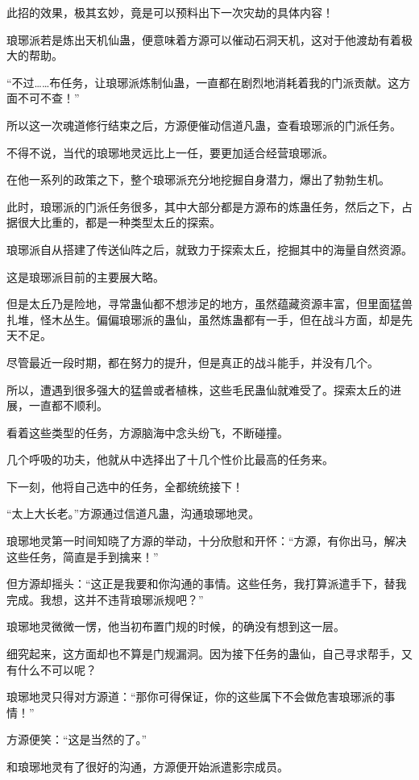 \begin{this_body}
此招的效果，极其玄妙，竟是可以预料出下一次灾劫的具体内容！

琅琊派若是炼出天机仙蛊，便意味着方源可以催动石洞天机，这对于他渡劫有着极大的帮助。

“不过……布任务，让琅琊派炼制仙蛊，一直都在剧烈地消耗着我的门派贡献。这方面不可不查！”

所以这一次魂道修行结束之后，方源便催动信道凡蛊，查看琅琊派的门派任务。

不得不说，当代的琅琊地灵远比上一任，要更加适合经营琅琊派。

在他一系列的政策之下，整个琅琊派充分地挖掘自身潜力，爆出了勃勃生机。

此时，琅琊派的门派任务很多，其中大部分都是方源布的炼蛊任务，然后之下，占据很大比重的，都是一种类型太丘的探索。

琅琊派自从搭建了传送仙阵之后，就致力于探索太丘，挖掘其中的海量自然资源。

这是琅琊派目前的主要展大略。

但是太丘乃是险地，寻常蛊仙都不想涉足的地方，虽然蕴藏资源丰富，但里面猛兽扎堆，怪木丛生。偏偏琅琊派的蛊仙，虽然炼蛊都有一手，但在战斗方面，却是先天不足。

尽管最近一段时期，都在努力的提升，但是真正的战斗能手，并没有几个。

所以，遭遇到很多强大的猛兽或者植株，这些毛民蛊仙就难受了。探索太丘的进展，一直都不顺利。

看着这些类型的任务，方源脑海中念头纷飞，不断碰撞。

几个呼吸的功夫，他就从中选择出了十几个性价比最高的任务来。

下一刻，他将自己选中的任务，全都统统接下！

“太上大长老。”方源通过信道凡蛊，沟通琅琊地灵。

琅琊地灵第一时间知晓了方源的举动，十分欣慰和开怀：“方源，有你出马，解决这些任务，简直是手到擒来！”

但方源却摇头：“这正是我要和你沟通的事情。这些任务，我打算派遣手下，替我完成。我想，这并不违背琅琊派规吧？”

琅琊地灵微微一愣，他当初布置门规的时候，的确没有想到这一层。

细究起来，这方面却也不算是门规漏洞。因为接下任务的蛊仙，自己寻求帮手，又有什么不可以呢？

琅琊地灵只得对方源道：“那你可得保证，你的这些属下不会做危害琅琊派的事情！”

方源便笑：“这是当然的了。”

和琅琊地灵有了很好的沟通，方源便开始派遣影宗成员。


\end{this_body}

